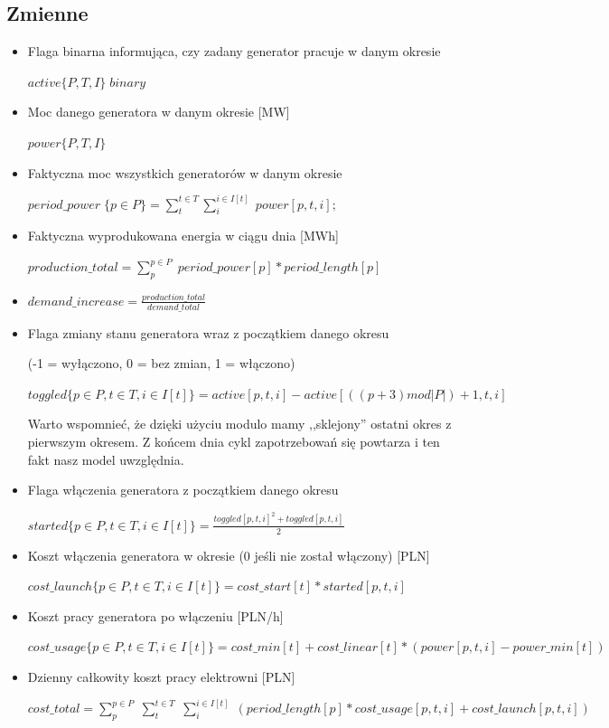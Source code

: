 \documentclass[12pt, twoside, hidelinks, a4paper]{article}
\begin{document}
\subsection{Zmienne}
\begin{itemize}

\item Flaga binarna informująca, czy zadany generator pracuje w danym okresie

$active\{P,T,I\} \; binary$
\item Moc danego generatora w danym okresie [MW]

$power\{P,T,I\}$
\item Faktyczna moc wszystkich generatorów w danym okresie

$period\_power \; \{p \in P\} = \sum_{t}^{t \in T} \sum_{i}^{i \in I[t]} \; power[p,t,i];$
\item Faktyczna wyprodukowana energia w ciągu dnia [MWh]

$production\_total = \sum_{p}^{p \in P} \; period\_power[p] * period\_length[p]$
\item 

$demand\_increase = \frac{production\_total}{demand\_total}$
\item Flaga zmiany stanu generatora wraz z początkiem danego okresu

(-1 = wyłączono, 0 = bez zmian, 1 = włączono)

$toggled \{p \in P, t \in T, i \in I[t] \} = active[p,t,i] - active[((p+3) mod |P|)+1,t,i]$

Warto wspomnieć, że dzięki użyciu modulo mamy ,,sklejony'' ostatni okres z pierwszym okresem. Z końcem dnia cykl zapotrzebowań się powtarza i ten fakt nasz model uwzględnia.
\item Flaga włączenia generatora z początkiem danego okresu

$started \{p \in P, t \in T, i \in I[t] \} = \frac{toggled[p,t,i]^2 + toggled[p,t,i]}{2}$
\item Koszt włączenia generatora w okresie (0 jeśli nie został włączony) [PLN]

$cost\_launch \{p \in P, t \in T, i \in I[t] \} = cost\_start[t] * started[p,t,i]$
\item Koszt pracy generatora po włączeniu [PLN/h]

$cost\_usage \{p \in P, t \in T, i \in I[t] \} = cost\_min[t] + cost\_linear[t] * (power[p,t,i] - power\_min[t])$
\item Dzienny całkowity koszt pracy elektrowni [PLN]

$cost\_total = \sum_{p}^{p \in P} \; \sum_{t}^{t \in T} \; \sum_{i}^{i \in I[t]} \; (period\_length[p] * cost\_usage[p,t,i] + cost\_launch[p,t,i])$
\end{itemize}
\end{document}
